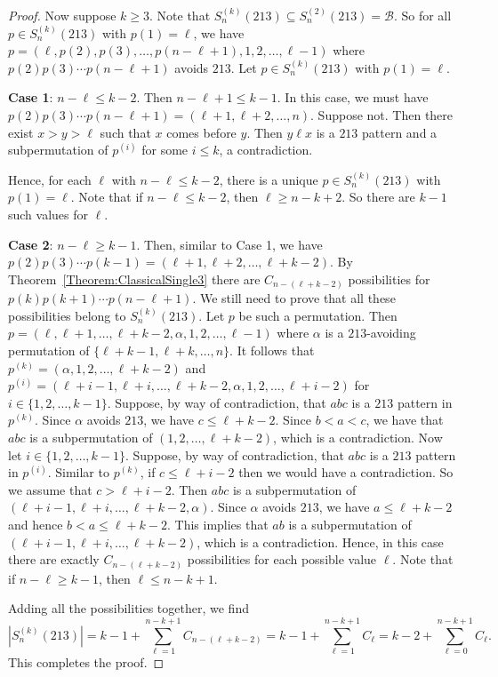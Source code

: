 \documentclass[10pt,a4paper]{amsart}
\numberwithin{equation}{section}
\begin{document}
\begin{proof}
Now suppose $k\geq3$. Note that $S_n^{(k)}(213)\subseteq S_n^{(2)}(213)=\mathcal{B}$. So for all $p\in S_n^{(k)}(213)$ with $p(1)=\ell$, we have $p=(\ell,p(2),p(3),\ldots,p(n-\ell+1),1,2,\ldots,\ell-1)$ 
where $p(2)p(3)\cdots p(n-\ell+1)$ avoids $213$. Let $p\in S_n^{(k)}(213)$ with $p(1)=\ell$.

\textbf{Case 1}: $n-\ell\leq k-2$. Then $n-\ell+1\leq k-1$. In this case, we must have $p(2)p(3)\cdots p(n-\ell+1)=(\ell+1,\ell+2,\ldots,n)$. 
Suppose not. Then there exist $x>y>\ell$ such that $x$ comes before $y$. 
Then $y\ell x$ is a $213$ pattern and a subpermutation of $p^{(i)}$ for some $i\leq k$,  a contradiction.

Hence, for each $\ell$ with $n-\ell\leq k-2$, there is a unique $p\in S_n^{(k)}(213)$ with $p(1)=\ell$. Note that if $n-\ell\leq k-2$, then $\ell\geq n-k+2$. So there are $k-1$ such values for $\ell$.

\textbf{Case 2}: $n-\ell\geq k-1$. 
Then, similar to Case 1, we have $p(2)p(3)\cdots p(k-1)=(\ell+1,\ell+2,\ldots,\ell+k-2)$. 
By Theorem~\ref{Theorem:ClassicalSingle3} there are $C_{n-(\ell+k-2)}$ possibilities for $p(k)p(k+1)\cdots p(n-\ell+1)$. We still need to prove that all these possibilities belong to $S^{(k)}_n(213)$. Let $p$ be such a permutation. Then $p=(\ell,\ell+1,\ldots,\ell+k-2,\alpha,1,2,\ldots,\ell-1)$ where $\alpha$ is a $213$-avoiding permutation of $\{\ell+k-1,\ell+k,\ldots,n\}$. It follows that $p^{(k)}=(\alpha,1,2,\ldots,\ell+k-2)$ and $p^{(i)}=(\ell+i-1,\ell+i,\ldots,\ell+k-2,\alpha,1,2,\ldots,\ell+i-2)$ for $i\in\{1,2,\ldots,k-1\}$. 
Suppose, by way of contradiction, that $abc$ is a $213$ pattern in $p^{(k)}$. Since $\alpha$ avoids $213$, we have $c\leq\ell+k-2$. Since $b<a<c$, we have that $abc$ is a subpermutation of $(1,2,\ldots,\ell+k-2)$, which is a contradiction. Now let $i\in\{1,2,\ldots,k-1\}$. 
Suppose, by way of contradiction, that $abc$ is a $213$ pattern in $p^{(i)}$. Similar to $p^{(k)}$, if $c\leq \ell+i-2$ then we would have a contradiction. So we assume that $c>\ell+i-2$.
Then $abc$ is a subpermutation of $(\ell+i-1,\ell+i,\ldots,\ell+k-2,\alpha)$. Since $\alpha$ avoids $213$, we have $a\leq\ell+k-2$ and hence $b<a\leq \ell+k-2$. This implies that $ab$ is a subpermutation of $(\ell+i-1,\ell+i,\ldots,\ell+k-2)$, which is a contradiction. Hence, in this case there are exactly $C_{n-(\ell+k-2)}$ possibilities for each possible value $\ell$. 
Note that if $n-\ell\geq k-1$, then $\ell\leq n-k+1$.

Adding all the possibilities together, we find
\[
|S_n^{(k)}(213)|=k-1+\sum_{\ell=1}^{n-k+1}C_{n-(\ell+k-2)}=k-1+\sum_{\ell=1}^{n-k+1}C_\ell=k-2+\sum_{\ell=0}^{n-k+1}C_\ell.
\]
This completes the proof.
\end{proof}
\end{document}
